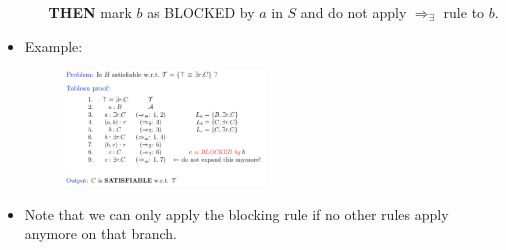 \begin{itemize}
\begin{itemize}
		\textbf{THEN} mark $b$ as BLOCKED by $a$ in $S$ and do not apply $\Rightarrow_{\exists}$ rule to $b$.
	\end{itemize}
	\item Example:
	\begin{figure}[ht!]
		\hspace{10mm}
		\includegraphics[width=0.5\textwidth]{figures/kr_dl_tableau_blocking_example.png}
	\end{figure}
	\item Note that we can only apply the blocking rule if no other rules apply anymore on that branch.
\end{itemize}